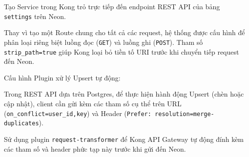 Tạo Service trong Kong trỏ trực tiếp đến endpoint REST API của bảng \texttt{settings} trên Neon.

Thay vì tạo một Route chung cho tất cả các request, hệ thống được cấu hình để phân loại riêng biệt luồng đọc (\texttt{GET}) và luồng ghi (\texttt{POST}). Tham số \texttt{strip\_path=true} giúp Kong loại bỏ tiền tố URI trước khi chuyển tiếp request đến Neon.

Cấu hình Plugin xử lý Upsert tự động:

Trong REST API dựa trên Postgres, để thực hiện hành động Upsert (chèn hoặc cập nhật), client cần gửi kèm các tham số cụ thể trên URL (\texttt{on\_conflict=user\_id,key}) và Header (\texttt{Prefer: resolution=merge-duplicates}).

Sử dụng plugin \texttt{request-transformer} để Kong API Gateway tự động đính kèm các tham số và header phức tạp này trước khi gửi đến Neon.
